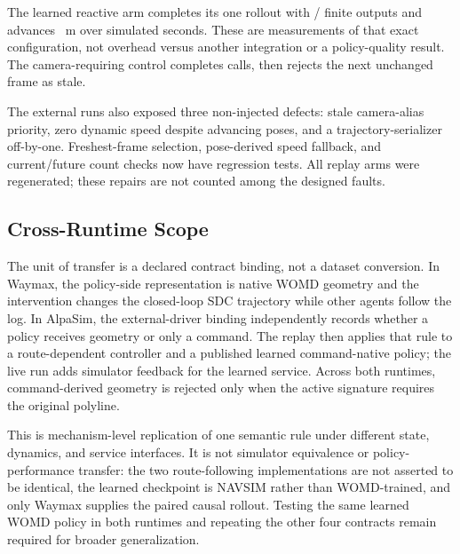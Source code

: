 \documentclass[a4paper,10pt,conference]{ieeeconf}
\begin{document}
\begin{table}[t]
\centering
\caption{Executed AlpaSim policy-family protocol replay. ``Moving'' means endpoint
progress exceeds 1~m; audit outcomes are recomputed from retained telemetry.}
\label{tab:replay-policies}
\resizebox{\columnwidth}{!}{}
\end{table}

The learned reactive arm completes its one rollout with
\CVMReactiveLearnedFiniteDriveOutputs{}/\CVMReactiveLearnedDriveRPCs{} finite outputs and
advances \CVMReactiveDistanceTraveledM{}~m over
\CVMReactiveSimulatedSeconds{} simulated seconds. These are measurements of that exact
configuration, not overhead versus another integration or a policy-quality result. The
camera-requiring control completes \CVMReactiveNegativeControlDrives{} calls, then
rejects the next unchanged frame as stale.

The external runs also exposed three non-injected defects: stale camera-alias priority,
zero dynamic speed despite advancing poses, and a trajectory-serializer off-by-one.
Freshest-frame selection, pose-derived speed fallback, and current/future count checks
now have regression tests. All replay arms were regenerated; these repairs are not
counted among the designed faults.

\subsection{Cross-Runtime Scope}

The unit of transfer is a declared contract binding, not a dataset conversion. In
Waymax, the policy-side representation is native WOMD geometry and the intervention
changes the closed-loop SDC trajectory while other agents follow the log. In AlpaSim,
the external-driver binding independently records whether a policy receives geometry
or only a command. The replay then applies that rule to a route-dependent controller
and a published learned command-native policy; the live run adds simulator feedback for
the learned service. Across both runtimes, command-derived geometry is rejected only
when the active signature requires the original polyline.

This is mechanism-level replication of one semantic rule under different state,
dynamics, and service interfaces. It is not simulator equivalence or policy-performance
transfer: the two route-following implementations are not asserted to be identical, the
learned checkpoint is NAVSIM rather than WOMD-trained, and only Waymax supplies the
paired causal rollout. Testing the same learned WOMD policy in both runtimes and
repeating the other four contracts remain required for broader generalization.
\end{document}
